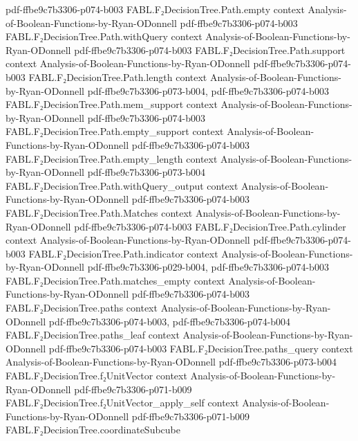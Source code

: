 \begin{theorem}
  {pdf-ffbe9c7b3306-p074-b003}
\proofstep
  {FABL.F₂DecisionTree.Path.empty}
  {context}
  {Analysis-of-Boolean-Functions-by-Ryan-ODonnell}
  {pdf-ffbe9c7b3306-p074-b003}
\proofstep
  {FABL.F₂DecisionTree.Path.withQuery}
  {context}
  {Analysis-of-Boolean-Functions-by-Ryan-ODonnell}
  {pdf-ffbe9c7b3306-p074-b003}
\proofstep
  {FABL.F₂DecisionTree.Path.support}
  {context}
  {Analysis-of-Boolean-Functions-by-Ryan-ODonnell}
  {pdf-ffbe9c7b3306-p074-b003}
\proofstep
  {FABL.F₂DecisionTree.Path.length}
  {context}
  {Analysis-of-Boolean-Functions-by-Ryan-ODonnell}
  {pdf-ffbe9c7b3306-p073-b004,
    pdf-ffbe9c7b3306-p074-b003}
\proofstep
  {FABL.F₂DecisionTree.Path.mem_support}
  {context}
  {Analysis-of-Boolean-Functions-by-Ryan-ODonnell}
  {pdf-ffbe9c7b3306-p074-b003}
\proofstep
  {FABL.F₂DecisionTree.Path.empty_support}
  {context}
  {Analysis-of-Boolean-Functions-by-Ryan-ODonnell}
  {pdf-ffbe9c7b3306-p074-b003}
\proofstep
  {FABL.F₂DecisionTree.Path.empty_length}
  {context}
  {Analysis-of-Boolean-Functions-by-Ryan-ODonnell}
  {pdf-ffbe9c7b3306-p073-b004}
\proofstep
  {FABL.F₂DecisionTree.Path.withQuery_output}
  {context}
  {Analysis-of-Boolean-Functions-by-Ryan-ODonnell}
  {pdf-ffbe9c7b3306-p074-b003}
\proofstep
  {FABL.F₂DecisionTree.Path.Matches}
  {context}
  {Analysis-of-Boolean-Functions-by-Ryan-ODonnell}
  {pdf-ffbe9c7b3306-p074-b003}
\proofstep
  {FABL.F₂DecisionTree.Path.cylinder}
  {context}
  {Analysis-of-Boolean-Functions-by-Ryan-ODonnell}
  {pdf-ffbe9c7b3306-p074-b003}
\proofstep
  {FABL.F₂DecisionTree.Path.indicator}
  {context}
  {Analysis-of-Boolean-Functions-by-Ryan-ODonnell}
  {pdf-ffbe9c7b3306-p029-b004,
    pdf-ffbe9c7b3306-p074-b003}
\proofstep
  {FABL.F₂DecisionTree.Path.matches_empty}
  {context}
  {Analysis-of-Boolean-Functions-by-Ryan-ODonnell}
  {pdf-ffbe9c7b3306-p074-b003}
\proofstep
  {FABL.F₂DecisionTree.paths}
  {context}
  {Analysis-of-Boolean-Functions-by-Ryan-ODonnell}
  {pdf-ffbe9c7b3306-p074-b003,
    pdf-ffbe9c7b3306-p074-b004}
\proofstep
  {FABL.F₂DecisionTree.paths_leaf}
  {context}
  {Analysis-of-Boolean-Functions-by-Ryan-ODonnell}
  {pdf-ffbe9c7b3306-p074-b003}
\proofstep
  {FABL.F₂DecisionTree.paths_query}
  {context}
  {Analysis-of-Boolean-Functions-by-Ryan-ODonnell}
  {pdf-ffbe9c7b3306-p073-b004}
\proofstep
  {FABL.F₂DecisionTree.f₂UnitVector}
  {context}
  {Analysis-of-Boolean-Functions-by-Ryan-ODonnell}
  {pdf-ffbe9c7b3306-p071-b009}
\proofstep
  {FABL.F₂DecisionTree.f₂UnitVector_apply_self}
  {context}
  {Analysis-of-Boolean-Functions-by-Ryan-ODonnell}
  {pdf-ffbe9c7b3306-p071-b009}
\proofstep
  {FABL.F₂DecisionTree.coordinateSubcube}

\end{theorem}
